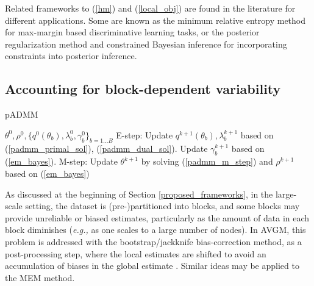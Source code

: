 \documentclass{article}
\newcommand{\eg}[0]{\emph{e.g., }}
\newcommand{\1}[0]{\ensuremath{\boldsymbol{1}}\xspace}
\begin{document}
Related frameworks to (\ref{hm}) and (\ref{local_obj}) are found in the literature for different applications. Some are known as the minimum relative entropy method \cite{Jaakkola1999, Zhu2012} for max-margin based discriminative learning tasks, or the posterior regularization method \cite{Ganchev2010} and constrained Bayesian inference \cite{Koyejo2013} for incorporating constraints into posterior inference.

\subsection{Accounting for block-dependent variability}\label{pADMM}

\begin{algorithm}[tb]
   \caption{pADMM}
   \label{alg:pADMM}
\begin{algorithmic}
    $\theta^0, \rho^0, \{q^0(\theta_b), \lambda_b^0, \gamma_b^0\}_{b=1\ldots B}$
   \STATE E-step: 
   \STATE Update $q^{k+1}(\theta_b), \lambda_b^{k+1}$ based on (\ref{padmm_primal_sol}), (\ref{padmm_dual_sol}).
   \STATE Update $\gamma_b^{k+1}$ based on (\ref{em_bayes}).
   \ENDFOR
   \STATE M-step:
   \STATE Update $\theta^{k+1}$ by solving (\ref{padmm_m_step}) and $\rho^{k+1}$ based on (\ref{em_bayes})
   \ENDFOR
\end{algorithmic}
\end{algorithm}

As discussed at the beginning of Section \ref{proposed_frameworks}, in the large-scale setting, the dataset is (pre-)partitioned into blocks, and some blocks may provide unreliable or biased estimates, particularly as the amount of data in each block diminishes (\eg as one scales to a large number of nodes). In AVGM, this problem is addressed with the bootstrap/jackknife bias-correction method, as a post-processing step, where the local estimates are shifted to avoid an accumulation of biases in the global estimate \cite{YZhang2012, Scott2013}. Similar ideas may be applied to the MEM method.
\end{document}
